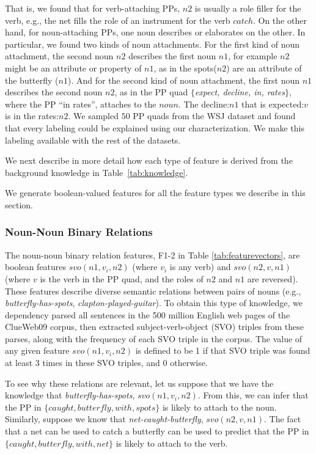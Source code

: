 That is, we found that for verb-attaching PPs, $n2$  is usually a role filler for the verb, e.g., the net fills the role of an instrument for the verb $catch$. On the other hand,  for noun-attaching PPs,  one noun describes or elaborates on the other. In particular, we found  two kinds of noun attachments. For the first kind of noun attachment,  the second noun $n2$ describes  the first noun $n1$, for example $n2$ might be  an attribute or property of $n1$, as in   the spots($n2$) are an attribute of the butterfly ($n1$).  And for the second kind of noun attachment, the first noun $n1$ describes the second noun $n2$, as  in the PP quad $\{${\em expect, decline, in, rates}$\}$,  where the PP ``in rates'', attaches to the $noun$. The decline:$n1$ that is expected:$v$ is in the rates:$n2$. We sampled $50$ PP quads from the WSJ dataset and found that every labeling could be explained using our characterization.  
 We make this labeling available with the rest of the datasets.



We next describe in more detail how each type of feature is derived from the  background knowledge  in Table~\ref{tab:knowledge}.

We generate boolean-valued features for all the feature types we describe in this section.

\subsubsection{Noun-Noun Binary Relations}
The noun-noun  binary relation features, F1-2 in Table \ref{tab:featurevectors}, are boolean features   $svo(n1,v_i,n2)$ (where $v_i$ is any verb) and $svo(n2,v,n1)$ (where $v$ is the verb in the PP quad, and the roles of $n2$ and $n1$ are reversed). These features describe diverse semantic relations between pairs of nouns (e.g.,   \textit{butterfly-has-spots},   \textit{clapton-played-guitar}).  To obtain this type of knowledge, we dependency parsed all sentences in the 500 million English web pages of the ClueWeb09 corpus, then extracted subject-verb-object (SVO) triples from these parses, along with the frequency of each SVO triple in the corpus.  The value of any given feature $svo(n1,v_i,n2)$ is defined to be 1 if that SVO triple was found at least $3$ times in these SVO triples, and 0 otherwise.


To see why these relations are relevant, let us suppose that  we have  the knowledge that \textit{butterfly-has-spots}, $svo(n1,v_i,n2)$. From this, we can  infer that the PP in $\{caught,butterfly, with, spots\}$ is likely to attach to the noun.   Similarly,  suppose we  know that \textit{net-caught-butterfly}, $svo(n2,v,n1)$. The fact   that a net can be used to catch a butterfly can be used to predict that  the  PP in\\ $\{caught,butterfly, with, net\}$ is likely to attach to the verb.   

